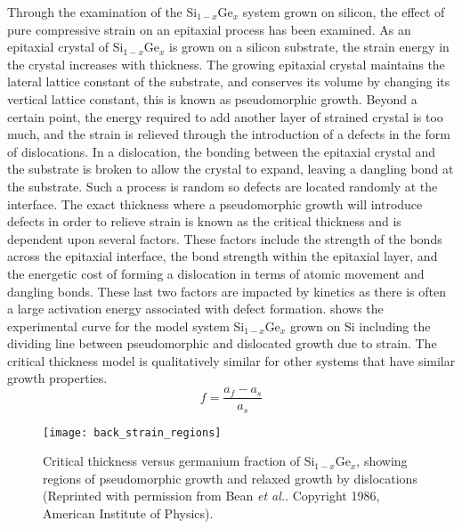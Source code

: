 Through the examination of the Si\(_{1-x}\)Ge\(_x\) system grown on silicon, the effect of pure compressive strain on an epitaxial process has been examined.
As an epitaxial crystal of Si\(_{1-x}\)Ge\(_x\) is grown on a silicon substrate, the strain energy in the crystal increases with thickness.
The growing epitaxial crystal maintains the lateral lattice constant of the substrate, and conserves its volume by changing its vertical lattice constant, this is known as pseudomorphic growth.
Beyond a certain point, the energy required to add another layer of strained crystal is too much, and the strain is relieved through the introduction of a defects in the form of dislocations.
In a dislocation, the bonding between the epitaxial crystal and the substrate is broken to allow the crystal to expand, leaving a dangling bond at the substrate.
Such a process is random so defects are located randomly at the interface.
The exact thickness where a pseudomorphic growth will introduce defects in order to relieve strain is known as the critical thickness and is dependent upon several factors.
These factors include the strength of the bonds across the epitaxial interface, the bond strength within the epitaxial layer, and the energetic cost of forming a dislocation in terms of atomic movement and dangling bonds.
These last two factors are impacted by kinetics as there is often a large activation energy associated with defect formation.
 shows the experimental curve for the model system Si\(_{1-x}\)Ge\(_x\) grown on Si including the dividing line between pseudomorphic and dislocated growth due to strain.
The critical thickness model is qualitatively similar for other systems that have similar growth properties.
\begin{equation}
 f = \frac{a_f - a_s}{a_s} \label{eqn:mismatch}
\end{equation}
\begin{figure}
 \centering \texttt{[image: back\_strain\_regions]}
 \caption[Critical thickness dependence on strain]{\label{fig:back_strain_regions}Critical thickness versus germanium fraction of Si\(_{1-x}\)Ge\(_x\), showing regions of pseudomorphic growth and relaxed growth by dislocations (Reprinted with permission from Bean \textit{et al.}\cite{Bean1986}.
  Copyright 1986, American Institute of Physics).}
\end{figure}
